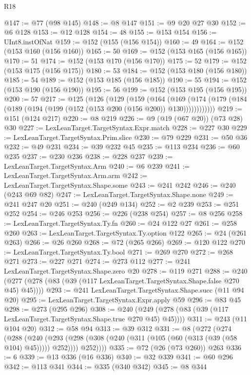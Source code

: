 \begin{lexlean}{R18}
\begin{coremodule}
{{{{{{{{{{{{{{{@147 := @77 (@98 @145)
@148 := @8 @147
@151 := @9 @20 @27 @30
@152 := @6 @128
@153 := @12 @128
@154 := 48
@155 := @153 @154
@156 := UInt8.instOfNat
@159 := @152 (@155 (@156 @154))
@160 := 49
@164 := @152 (@153 @160 (@156 @160))
@165 := 50
@169 := @152 (@153 @165 (@156 @165))
@170 := 51
@174 := @152 (@153 @170 (@156 @170))
@175 := 52
@179 := @152 (@153 @175 (@156 @175))
@180 := 53
@184 := @152 (@153 @180 (@156 @180))
@185 := 54
@189 := @152 (@153 @185 (@156 @185))
@190 := 55
@194 := @152 (@153 @190 (@156 @190))
@195 := 56
@199 := @152 (@153 @195 (@156 @195))
@200 := 57
@217 := @125
    (@126
      (@129
        (@159
          (@164
            (@169 (@174 (@179 (@184 (@189 (@194 (@199 (@152 (@153 @200 (@156 @200)) @130))))))))))))
@219 := @151 (@124 @217)
@220 := @8 @219
@226 := @9 (@19 (@67 @20)) (@73 @28) @30
@227 := LexLeanTarget.TargetSyntax.Expr.match
@228 := @227 @30
@229 := LexLeanTarget.TargetSyntax.Prim.slice
@230 := @79 @229
@231 := @50 @36
@232 := @49 @231
@234 := @39 @232 @45
@235 := @113 @234
@236 := @60 @235
@237 := @230 @236
@238 := @228 @237
@239 := LexLeanTarget.TargetSyntax.Arm
@240 := @6 @239
@241 := LexLeanTarget.TargetSyntax.Arm.arm
@242 := LexLeanTarget.TargetSyntax.Shape.some
@243 := @241 @242
@246 := @240 (@243 @69 @82)
@247 := LexLeanTarget.TargetSyntax.Shape.none
@249 := @241 @247 @20
@251 := @240 (@249 @134)
@252 := @2 @239
@253 := @251 @252
@254 := @246 @253
@256 := @226 (@238 @254)
@257 := @8 @256
@258 := LexLeanTarget.TargetSyntax.Ty.fn
@260 := @24 @122 @27
@261 := @258 @260
@263 := LexLeanTarget.TargetSyntax.Ty.option @122
@265 := @24 (@261 @263)
@266 := @26 @260
@268 := @72 (@265 @266)
@269 := @120 @122
@270 := LexLeanTarget.TargetSyntax.Ty.bool
@271 := @269 @270
@272 := @268 @271
@273 := @227 @271
@274 := @273 @112
@277 := @241 LexLeanTarget.TargetSyntax.Shape.zero @20
@278 := @119 @271
@288 := @240 (@277 (@278 (@83 (@39 (@117 LexLeanTarget.TargetSyntax.Shape.false @270 @45) @45))))
@293 := @241 LexLeanTarget.TargetSyntax.Shape.succ (@11 @94 @20)
@295 := LexLeanTarget.TargetSyntax.Expr.apply @59
@296 := @83 @45
@298 := @273 (@295 @296)
@308 := @240 (@249 (@278 (@83 (@39 (@117 LexLeanTarget.TargetSyntax.Shape.true @270 @45) @45))))
@311 := @243 (@11 @104 @20)
@312 := @58 @94
@313 := @39 @312
@331 := @8
    (@272
      (@274
        (@288
          (@240
            (@293 (@298 (@308 (@240 (@311 (@105 (@60 (@313 (@39 (@58 @104) @45))))) @252))))
            @252))))
@335 := @72 (@26 (@73 @260)) @263
@336 := 6
@339 := @13 @336 (@16 @336)
@340 := @32 @339
@341 := @60 @296
@342 := @113 @341
@344 := @335 (@340 @342)
@345 := @8 @344
}}}}}}}}}}}}}}}
\end{coremodule}
\end{lexlean}
